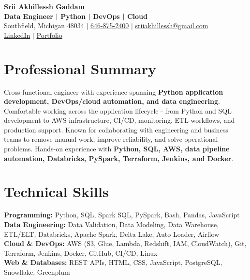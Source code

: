 \documentclass[letterpaper,10pt]{article}
\begin{document}
\fontsize{9.35pt}{10.45pt}\selectfont

\begin{center}
    {\LARGE \textbf{Srii Akhillessh Gaddam}} \\[-1pt]
    \textbf{Data Engineer | Python | DevOps | Cloud} \\[2pt]
    Southfield, Michigan 48034 $|$
    \href{tel:6468752400}{646-875-2400} $|$
    \href{mailto:sriiakhillessh@gmail.com}{sriiakhillessh@gmail.com} \\[1pt]
    \href{https://www.linkedin.com/in/srii-akhiilessh-gaddam-b48668191/}{LinkedIn} $|$
    \href{https://sriiakhillesshg.github.io/portfolio/}{Portfolio}
\end{center}
\vspace{-8pt}

\section{Professional Summary}
\small{Cross-functional engineer with experience spanning \textbf{Python application development, DevOps/cloud automation, and data engineering}. Comfortable working across the application lifecycle - from Python and SQL development to AWS infrastructure, CI/CD, monitoring, ETL workflows, and production support. Known for collaborating with engineering and business teams to remove manual work, improve reliability, and solve operational problems. Hands-on experience with \textbf{Python, SQL, AWS, data pipeline automation, Databricks, PySpark, Terraform, Jenkins, and Docker}.}

\section{Technical Skills}
\small{
\textbf{Programming:} Python, SQL, Spark SQL, PySpark, Bash, Pandas, JavaScript \\
\textbf{Data Engineering:} Data Validation, Data Modeling, Data Warehouse, ETL/ELT, Databricks, Apache Spark, Delta Lake, Auto Loader, Airflow \\
\textbf{Cloud \& DevOps:} AWS (S3, Glue, Lambda, Redshift, IAM, CloudWatch), Git, Terraform, Jenkins, Docker, GitHub, CI/CD, Linux \\
\textbf{Web \& Databases:} REST APIs, HTML, CSS, JavaScript, PostgreSQL, Snowflake, Greenplum
}
\end{document}
